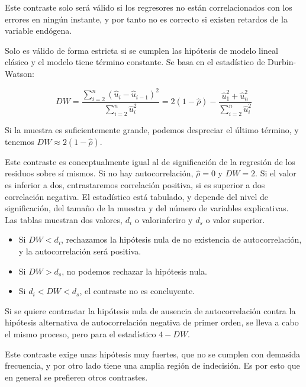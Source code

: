Este contraste solo ser\'a v\'alido si los regresores no est\'an correlacionados con los errores en ning\'un instante, y por tanto no es correcto si existen retardos de la variable end\'ogena.

Solo es v\'alido de forma estricta si se cumplen las hip\'otesis de modelo lineal cl\'asico y el modelo tiene t\'ermino constante. Se basa en el estad\'istico de Durbin-Watson:

\[
DW=\dfrac{\sum_{i=2}^{n}\left(\hat{u}_{i}-\hat{u}_{i-1}\right)^{2}}{\sum_{i=2}^{n}\hat{u}_{i}^{2}}=2(1-\hat{\rho})-\dfrac{\hat{u}_1^2+\hat{u}_n^2}{\sum_{i=2}^{n}\hat{u}_{i}^{2}}
\]

Si la muestra es suficientemente grande, podemos despreciar el \'ultimo t\'ermino, y tenemos $DW\approx 2(1-\hat{\rho})$.

Este contraste es conceptualmente igual al de significaci\'on de la regresi\'on de los residuos sobre s\'i mismos. Si no hay autocorrelaci\'on, $\hat{\rho}=0$ y $DW=2$. Si el valor es inferior a dos, cntrastaremos correlaci\'on positiva, si es superior a dos correlaci\'on negativa. El estad\'istico est\'a tabulado, y depende del nivel de significaci\'on, del tama\~no de la muestra y del n\'umero de variables explicativas. Las tablas muestran dos valores, $d_i$ o valorinferiro y $d_s$ o valor superior.
\begin{itemize}
\item Si $DW<d_i$, rechazamos la hip\'otesis nula de no existencia de autocorrelaci\'on, y la autocorrelaci\'on ser\'a positiva.
\item Si $DW>d_s$, no podemos rechazar la hip\'otesis nula.
\item Si $d_i<DW<d_s$, el contraste no es concluyente.
\end{itemize}

Si se quiere contrastar la hip\'otesis nula de ausencia de autocorrelaci\'on contra la hip\'otesis alternativa de autocorrelaci\'on negativa de primer orden, se lleva a cabo el mismo proceso, pero para el estad\'istico $4-DW$.

Este contraste exige unas hip\'otesis muy fuertes, que no se cumplen con demasida frecuencia, y por otro lado tiene una amplia regi\'on de indecisi\'on. Es por esto que en general se prefieren otros contrastes.




